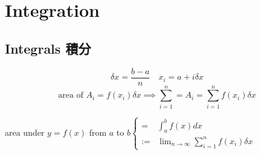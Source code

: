 %
%

\graphicspath{{./figures/integration/}}


\def\showissues{y}
\def\showintremarks{n}


\chapter{Integration} \label{chap integral}
\section{Integrals 積分}
$$\displaystyle \delta x = \frac{b-a}{n} \quad x_i = a+i\delta x$$
$$\text{area of }A_i = f(x_i) \delta x \displaystyle \implies \sum\limits_{i=1}^n=A_i=\sum\limits_{i=1}^n f(x_i)\delta x$$
\begin{defn}
area under $y=f(x)$ from $a$ to $b \left\{\begin{array}{cl} 
= & \displaystyle \int_a^b f(x)dx\\
:= & \displaystyle \lim_{n\to \infty} \sum\limits_{i=1}^n f(x_i)\delta x
\end{array}\right.$
\end{defn}
